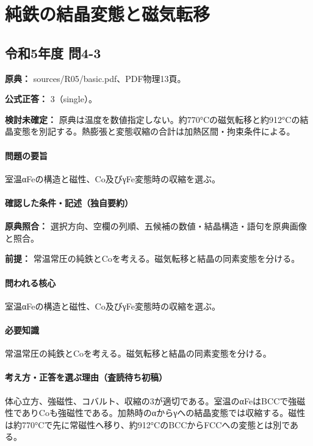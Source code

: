 \section{純鉄の結晶変態と磁気転移}

\subsection{令和5年度 問4-3}
\label{q:r05-reg-basic-4-3}

\noindent\textbf{原典：} sources/R05/basic.pdf、PDF物理13頁。

\textbf{公式正答：} 3（single）。

\par\textbf{検討未確定：} 原典は温度を数値指定しない。約770°Cの磁気転移と約912°Cの結晶変態を別記する。熱膨張と変態収縮の合計は加熱区間・拘束条件による。

\paragraph{問題の要旨} 室温αFeの構造と磁性、Co及びγFe変態時の収縮を選ぶ。

\paragraph{確認した条件・記述（独自要約）}\mbox{}\par

\noindent\textbf{原典照合：} 選択方向、空欄の列順、五候補の数値・結晶構造・語句を原典画像と照合。\par

\noindent\textbf{前提：} 常温常圧の純鉄とCoを考える。磁気転移と結晶の同素変態を分ける。\par

\paragraph{問われる核心} 室温αFeの構造と磁性、Co及びγFe変態時の収縮を選ぶ。

\paragraph{必要知識} 常温常圧の純鉄とCoを考える。磁気転移と結晶の同素変態を分ける。

\paragraph{考え方・正答を選ぶ理由（査読待ち初稿）} 体心立方、強磁性、コバルト、収縮の3が適切である。室温のαFeはBCCで強磁性でありCoも強磁性である。加熱時のαからγへの結晶変態では収縮する。磁性は約770°Cで先に常磁性へ移り、約912°CのBCCからFCCへの変態とは別である。

